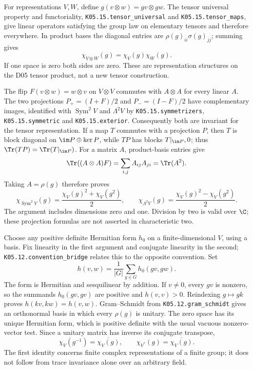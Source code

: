 For representations $V,W$, define
$g(v\otimes w)=gv\otimes gw$. The tensor universal property and
functoriality, \texttt{K05.15.tensor\_universal} and
\texttt{K05.15.tensor\_maps}, give linear operators satisfying the
group law on elementary tensors and therefore everywhere. In product
bases the diagonal entries are $\rho(g)_{ii}\sigma(g)_{jj}$; summing
gives
\[
 \chi_{V\otimes W}(g)=\chi_V(g)\chi_W(g).
\]
If one space is zero both sides are zero. These are representation
structures on the D05 tensor product, not a new tensor construction.

The flip $F(v\otimes w)=w\otimes v$ on $V\otimes V$ commutes
with $A\otimes A$ for every linear $A$. The two projections
$P_+=(I+F)/2$ and $P_-=(I-F)/2$ have complementary images,
identified with $\operatorname{Sym}^2V$ and $\Lambda^2V$ by
\texttt{K05.15.symmetrizers}, \texttt{K05.15.symmetric} and
\texttt{K05.15.exterior}. Consequently both are invariant for the
tensor representation. If a map $T$ commutes with a projection $P$,
then $T$ is block diagonal on $\im P\oplus\ker P$, while $TP$
has blocks $T|_{\im P},0$; thus $\Tr(TP)=\Tr(T|_{\im P})$.
For a matrix $A$, product-basis entries give
\[
 \Tr((A\otimes A)F)=\sum_{i,j}A_{ij}A_{ji}=\Tr(A^2).
\]
Taking $A=\rho(g)$ therefore proves
\[
 \chi_{\operatorname{Sym}^2 V}(g)
  =\frac{\chi_V(g)^2+\chi_V(g^2)}2,\qquad
 \chi_{\Lambda^2 V}(g)
  =\frac{\chi_V(g)^2-\chi_V(g^2)}2.
\]
The argument includes dimensions zero and one. Division by two is valid
over $\C$; these projection formulas are not asserted in characteristic
two.

Choose any positive definite Hermitian form $h_0$ on a finite-dimensional
$V$, using a basis. Fix linearity in the first argument and conjugate
linearity in the second; \texttt{K05.12.convention\_bridge} relates this
to the opposite convention. Set
\[
 h(v,w)=\frac1{|G|}\sum_{g\in G}h_0(gv,gw).
\]
The form is Hermitian and sesquilinear by addition. If $v\ne0$, every
$gv$ is nonzero, so the summands $h_0(gv,gv)$ are positive and
$h(v,v)>0$. Reindexing $g\mapsto gk$ proves
$h(kv,kw)=h(v,w)$. Gram--Schmidt from
\texttt{K05.12.gram\_schmidt} gives an orthonormal basis in which every
$\rho(g)$ is unitary. The zero space has its unique Hermitian form,
which is positive definite with the usual vacuous nonzero-vector test.
Since a unitary matrix has inverse its conjugate transpose,
\[
 \chi_V(g^{-1})=\overline{\chi_V(g)},\qquad
 \chi_{V^*}(g)=\overline{\chi_V(g)}.
\]
The first identity concerns finite complex representations of a finite
group; it does not follow from trace invariance alone over an arbitrary
field.

